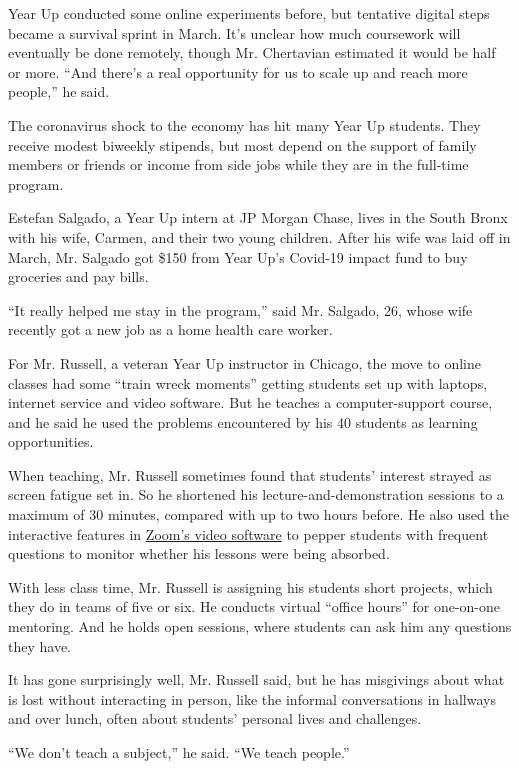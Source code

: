 Year Up conducted some online experiments before, but tentative digital
steps became a survival sprint in March. It's unclear how much
coursework will eventually be done remotely, though Mr. Chertavian
estimated it would be half or more. ``And there's a real opportunity for
us to scale up and reach more people,'' he said.

The coronavirus shock to the economy has hit many Year Up students. They
receive modest biweekly stipends, but most depend on the support of
family members or friends or income from side jobs while they are in the
full-time program.

Estefan Salgado, a Year Up intern at JP Morgan Chase, lives in the South
Bronx with his wife, Carmen, and their two young children. After his
wife was laid off in March, Mr. Salgado got \$150 from Year Up's
Covid-19 impact fund to buy groceries and pay bills.

``It really helped me stay in the program,'' said Mr. Salgado, 26, whose
wife recently got a new job as a home health care worker.

For Mr. Russell, a veteran Year Up instructor in Chicago, the move to
online classes had some ``train wreck moments'' getting students set up
with laptops, internet service and video software. But he teaches a
computer-support course, and he said he used the problems encountered by
his 40 students as learning opportunities.

When teaching, Mr. Russell sometimes found that students' interest
strayed as screen fatigue set in. So he shortened his
lecture-and-demonstration sessions to a maximum of 30 minutes, compared
with up to two hours before. He also used the interactive features in
\href{https://www.nytimes.com/2020/04/24/technology/zoom-rivals-virus-facebook-google.html}{Zoom's
video software} to pepper students with frequent questions to monitor
whether his lessons were being absorbed.

With less class time, Mr. Russell is assigning his students short
projects, which they do in teams of five or six. He conducts virtual
``office hours'' for one-on-one mentoring. And he holds open sessions,
where students can ask him any questions they have.

It has gone surprisingly well, Mr. Russell said, but he has misgivings
about what is lost without interacting in person, like the informal
conversations in hallways and over lunch, often about students' personal
lives and challenges.

``We don't teach a subject,'' he said. ``We teach people.''

